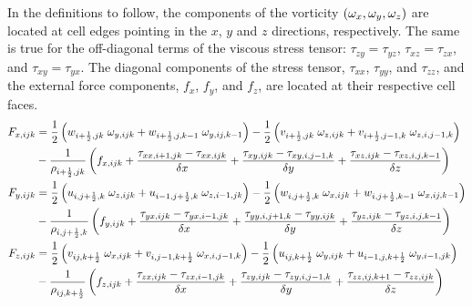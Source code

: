 In the
definitions to follow, the components of the vorticity $(\omega_x,\omega_y,\omega_z)$
are located at cell edges pointing in the $x$, $y$ and $z$ directions,
respectively. The same is true for the off-diagonal terms of the viscous
stress tensor: $\tau_{zy}=\tau_{yz}$, $\tau_{xz}=\tau_{zx}$, and
$\tau_{xy}=\tau_{yx}$. The diagonal components of the stress
tensor, $\tau_{xx}$, $\tau_{yy}$, and $\tau_{zz}$, and the external force
components, $f_x$, $f_y$, and $f_z$, are located at their
respective cell faces.
\begin{align}
F_{x,ijk} &=  \frac{1}{2} \left(
 w_{i+\frac{1}{2},jk} \; \omega_{y,ijk} +
 w_{i+\frac{1}{2},j,k-1} \; \omega_{y,ij,k-1} \right)
            - \frac{1}{2} \left(
 v_{i+\frac{1}{2},jk} \; \omega_{z,ijk} +
 v_{i+\frac{1}{2},j-1,k} \; \omega_{z,i,j-1,k} \right) \nonumber\\
           &  - \frac{1}{\rho_{i+\frac{1}{2},jk}} \left( f_{x,ijk}
  + \frac{\tau_{xx,i+1,jk}-\tau_{xx,ijk}}{\delta x}
  + \frac{\tau_{xy,ijk}-\tau_{xy,i,j-1,k}}{\delta y}
  + \frac{\tau_{xz,ijk}-\tau_{xz,i,j,k-1}}{\delta z}  \right)  \\
F_{y,ijk} &= \frac{1}{2} \left(
 u_{i,j+\frac{1}{2},k} \; \omega_{z,ijk} +
 u_{i-1,j+\frac{1}{2},k} \; \omega_{z,i-1,jk} \right)
             - \frac{1}{2} \left(
 w_{i,j+\frac{1}{2},k} \; \omega_{x,ijk}+
 w_{i,j+\frac{1}{2},k-1} \; \omega_{x,ij,k-1} \right) \nonumber \\
           &  - \frac{1}{\rho_{i,j+\frac{1}{2},k}} \left( f_{y,ijk}
  + \frac{\tau_{yx,ijk}-\tau_{yx,i-1,jk}}{\delta x}
  + \frac{\tau_{yy,i,j+1,k}-\tau_{yy,ijk}}{\delta y}
  + \frac{\tau_{yz,ijk}-\tau_{yz,i,j,k-1}}{\delta z} \right) \\
F_{z,ijk} &=  \frac{1}{2} \left(
 v_{ij,k+\frac{1}{2}} \; \omega_{x,ijk} +
 v_{i,j-1,k+\frac{1}{2}} \; \omega_{x,i,j-1,k} \right)
             -\frac{1}{2} \left(
 u_{ij,k+\frac{1}{2}} \; \omega_{y,ijk} +
 u_{i-1,j,k+\frac{1}{2}} \; \omega_{y,i-1,jk} \right) \nonumber \\
           &  - \frac{1}{\rho_{ij,k+\frac{1}{2}}} \left( f_{z,ijk}
  + \frac{\tau_{zx,ijk}-\tau_{zx,i-1,jk}}{\delta x}
  + \frac{\tau_{zy,ijk}-\tau_{zy,i,j-1,k}}{\delta y}
  + \frac{\tau_{zz,ij,k+1}-\tau_{zz,ijk}}{\delta z} \right)
\end{align}

